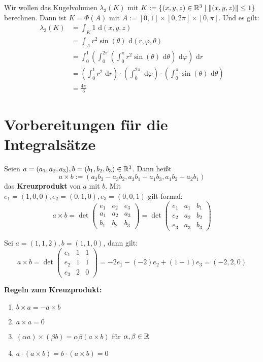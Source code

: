 \documentclass[a4paper,twoside,DIV15,BCOR12mm,chapterprefix=true,headings=onelinechapter]{scrbook}
\begin{document}
\begin{beispiel}
Wir wollen das Kugelvolumen $\lambda_3(K)$ mit $K:=\{(x,y,z)\in\mathbb{R}^3\mid\|(x,y,z)\|\le 1\}$ berechnen. Dann ist $K=\Phi(A)$ mit $A:= [0,1]\times[0,2\pi]\times [0,\pi]$. Und es gilt:
\begin{align*}
\lambda_3(K)&=\int_K 1\text{ d}(x,y,z)\\
&=\int_A r^2\sin(\theta)\text{ d}(r,\varphi,\theta)\\
&=\int_0^1(\int_0^{2\pi}(\int_0^\pi r^2\sin(\theta) \text{ d}\theta)\text{ d}\varphi)\text{ d}r\\
&=(\int_0^1 r^2 \text{ d}r)\cdot(\int_0^{2\pi} \text{ d}\varphi)\cdot(\int_0^\pi \sin(\theta) \text{ d}\theta)\\
&=\frac{4\pi}3
\end{align*}
\end{beispiel}


\chapter{Vorbereitungen für die Integralsätze}
\begin{definition}
Seien $a=(a_1,a_2,a_3),b=(b_1,b_2,b_3)\in\mathbb{R}^3$. Dann heißt
\[a\times b:=(a_2b_3-a_3b_2,a_3b_1-a_1b_3,a_1b_2-a_2b_1)\]
das \textbf{Kreuzprodukt} von $a$ mit $b$.
Mit $e_1=(1,0,0),e_2=(0,1,0),e_3=(0,0,1)$ gilt formal:
\[a\times b = \det\begin{pmatrix}e_1&e_2&e_3\\a_1&a_2&a_3\\b_1&b_2&b_3\end{pmatrix}=\det\begin{pmatrix}e_1&a_1&b_1\\e_2&a_2&b_2\\e_3&a_3&b_3\end{pmatrix}\]
\end{definition}

\begin{beispiel}
Sei $a=(1,1,2), b=(1,1,0)$, dann gilt:
\[a\times b= \det \begin{pmatrix}e_1&1&1\\e_2&1&1\\e_3&2&0\end{pmatrix}=-2e_1-(-2)e_2+(1-1)e_3=(-2,2,0)\]
\end{beispiel}

\textbf{Regeln zum Kreuzprodukt:}
\begin{enumerate}
\item $b\times a= -a\times b$
\item $a\times a=0$
\item $(\alpha a)\times(\beta b)=\alpha\beta(a\times b)$ für $\alpha,\beta\in\mathbb{R}$
\item $a\cdot(a\times b)=b\cdot(a\times b)=0$
\end{enumerate}
\end{document}
